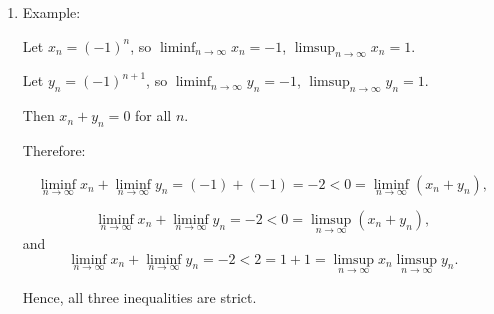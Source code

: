 \documentclass[12pt]{article}
\newcommand{\limsupn}[1]{\displaystyle\limsup_{n\rightarrow \infty}#1}
\newcommand{\liminfn}[1]{\displaystyle\liminf_{n\rightarrow \infty}#1}
\begin{document}
\begin{enumerate}
\begin{enumerate}
              \item Example:

                    Let \(x_n = (-1)^n\), so \(\liminfn{x_n} = -1\), \(\limsupn{x_n} = 1\).

                    Let \(y_n = (-1)^{n+1}\), so \(\liminfn{y_n} = -1\), \(\limsupn{y_n} = 1\).

                    Then \(x_n + y_n = 0\) for all \(n\).

                    Therefore:

                    \[
                        \liminfn{x_n} + \liminfn{y_n} = (-1) + (-1) = -2 < 0 = \liminfn{(x_n + y_n)},
                    \]

                    \[
                        \liminfn{x_{n}} + \liminfn{y_{n}} = -2 < 0 = \limsupn{(x_n + y_n)},
                    \]
                    and 
                    \[
                    \liminfn{x_{n}} + \liminfn{y_{n}} = - 2 < 2 = 1 + 1 = \limsupn{x_{n}} \limsupn{y_{n}}.
                    \]

                    Hence, all three inequalities are strict.

          \end{enumerate}
\end{enumerate}
\end{document}
